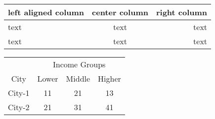 \documentclass[11pt]{article}
\begin{document}
\begin{tabular}{|lcr||}
left aligned column & center column & right column\\
\hline
text & text & text\\
text & text & text\\
\end{tabular}

\begin{center}
\begin{tabular}{|c|c|c|c|}
\hline
&\multicolumn{3}{|c|}{Income Groups}\\
\cline{2-4}
City&Lower&Middle&Higher\\
\hline
City-1&11&21&13\\
City-2&21&31&41\\
\hline
\end{tabular}
\end{center}
\end{document}
